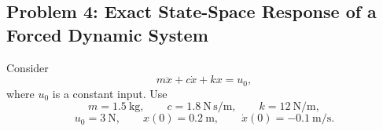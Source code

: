 \subsection*{Problem 4: Exact State-Space Response of a Forced Dynamic System}

Consider
\begin{equation}
m\ddot{x}
+
c\dot{x}
+
kx
=
u_0,
\end{equation}
where $u_0$ is a constant input. Use
\begin{equation}
m=1.5~\mathrm{kg},
\qquad
c=1.8~\mathrm{N\,s/m},
\qquad
k=12~\mathrm{N/m},
\end{equation}
\begin{equation}
u_0=3~\mathrm{N},
\qquad
x(0)=0.2~\mathrm{m},
\qquad
\dot{x}(0)=-0.1~\mathrm{m/s}.
\end{equation}

